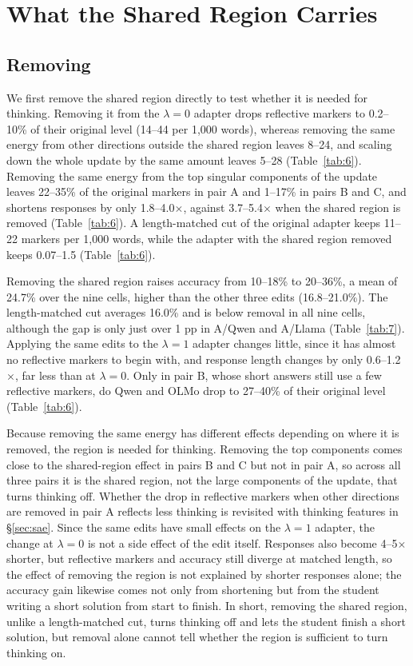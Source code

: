 \section{What the Shared Region Carries}\label{sec:carries}

\subsection{Removing}\label{sec:remove}

We first remove the shared region directly to test whether it is needed for thinking. Removing it from the $\lambda=0$ adapter drops reflective markers to 0.2--10\% of their original level (14--44 per 1,000 words), whereas removing the same energy from other directions outside the shared region leaves 8--24, and scaling down the whole update by the same amount leaves 5--28 (Table~\ref{tab:6}). Removing the same energy from the top singular components of the update \citep{lee2025goldswitch} leaves 22--35\% of the original markers in pair A and 1--17\% in pairs B and C, and shortens responses by only 1.8--4.0$\times$, against 3.7--5.4$\times$ when the shared region is removed (Table~\ref{tab:6}). A length-matched cut of the original adapter keeps 11--22 markers per 1,000 words, while the adapter with the shared region removed keeps 0.07--1.5 (Table~\ref{tab:6}).

Removing the shared region raises accuracy from 10--18\% to 20--36\%, a mean of 24.7\% over the nine cells, higher than the other three edits (16.8--21.0\%). The length-matched cut averages 16.0\% and is below removal in all nine cells, although the gap is only just over 1 pp in A/Qwen and A/Llama (Table~\ref{tab:7}). Applying the same edits to the $\lambda=1$ adapter changes little, since it has almost no reflective markers to begin with, and response length changes by only 0.6--1.2$\times$, far less than at $\lambda=0$. Only in pair B, whose short answers still use a few reflective markers, do Qwen and OLMo drop to 27--40\% of their original level (Table~\ref{tab:6}).

Because removing the same energy has different effects depending on where it is removed, the region is needed for thinking. Removing the top components comes close to the shared-region effect in pairs B and C but not in pair A, so across all three pairs it is the shared region, not the large components of the update, that turns thinking off. Whether the drop in reflective markers when other directions are removed in pair A reflects less thinking is revisited with thinking features in \S\ref{sec:sae}. Since the same edits have small effects on the $\lambda=1$ adapter, the change at $\lambda=0$ is not a side effect of the edit itself. Responses also become 4--5$\times$ shorter, but reflective markers and accuracy still diverge at matched length, so the effect of removing the region is not explained by shorter responses alone; the accuracy gain likewise comes not only from shortening but from the student writing a short solution from start to finish. In short, removing the shared region, unlike a length-matched cut, turns thinking off and lets the student finish a short solution, but removal alone cannot tell whether the region is sufficient to turn thinking on.

